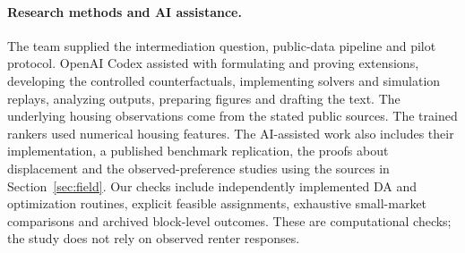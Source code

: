 \paragraph{Research methods and AI assistance.}
The team supplied the intermediation question, public-data pipeline and pilot protocol. OpenAI Codex assisted with formulating and proving extensions, developing the controlled counterfactuals, implementing solvers and simulation replays, analyzing outputs, preparing figures and drafting the text. The underlying housing observations come from the stated public sources. The trained rankers used numerical housing features. The AI-assisted work also includes their implementation, a published benchmark replication, the proofs about displacement and the observed-preference studies using the sources in Section~\ref{sec:field}. Our checks include independently implemented DA and optimization routines, explicit feasible assignments, exhaustive small-market comparisons and archived block-level outcomes. These are computational checks; the study does not rely on observed renter responses.

